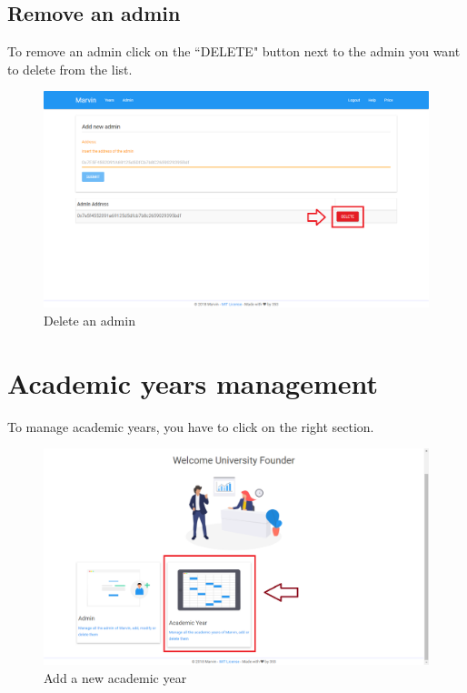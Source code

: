 \documentclass[ManualeUtente]{subfiles}
\begin{document}
	\subsection{Remove an admin}
	To remove an admin click on the ``DELETE" button next to the admin you want to delete from the list.
	\begin{figure}[H]
		\centering
		\includegraphics[width=0.7\linewidth]{image/DeleteAdmin}
		\caption[Delete admin]{Delete an admin}
		\label{fig:Delete an admin}
	\end{figure}
	\newpage
	
	\section{Academic years management}
	To manage academic years, you have to click on the right section.
	\begin{figure}[H]
		\centering
		\includegraphics[width=0.7\linewidth]{image/UniAcademicYear}
		\caption[Add year]{Add a new academic year}
		\label{fig:Add a new academic year}
	\end{figure}
\end{document}
